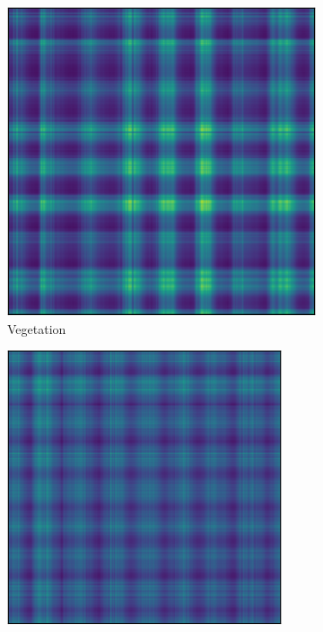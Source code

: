 \documentclass{article}
\begin{document}
\begin{figure}[h] 
  \begin{subfigure}[b]{0.5\linewidth}
    \centering
    \includegraphics[width=0.89\linewidth]{veg-crop.pdf} 
    \caption{Vegetation} 
    \label{fig7:a} 
    \vspace{6ex}
  \end{subfigure}%
  \begin{subfigure}[b]{0.5\linewidth}
    \centering
    \includegraphics[width=0.89\textwidth]{bwt-crop.pdf} 

\end{subfigure}
\end{figure}
\end{document}
